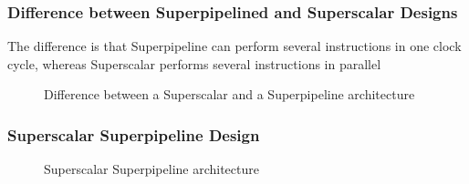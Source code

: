 \subsubsection{Difference between Superpipelined and Superscalar Designs}
The difference is that Superpipeline can perform several instructions in one clock cycle, whereas Superscalar performs several instructions in parallel

\begin{figure}[H]
  \centering
  \caption{Difference between a Superscalar and a Superpipeline architecture}
  \label{fig:superscalar-vs-superpipeline}
\end{figure}


\subsubsection{Superscalar Superpipeline Design}

\begin{figure}[H]
  \centering
  \caption{Superscalar Superpipeline architecture}
  \label{fig:superscalar-superpipeline}
\end{figure}

